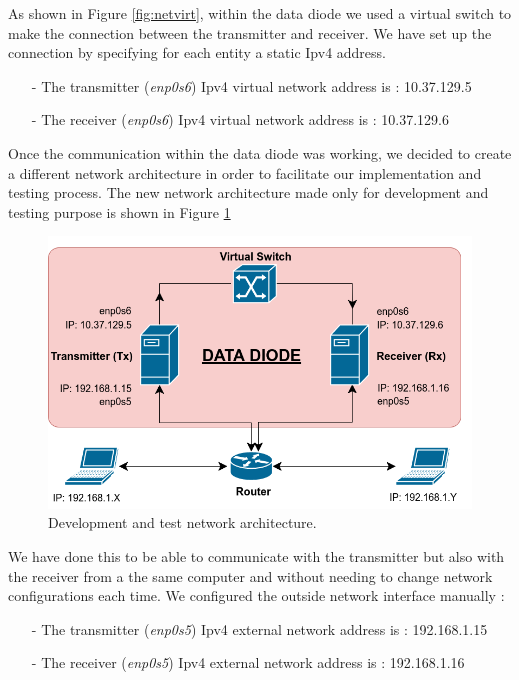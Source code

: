 \documentclass[a4paper,10pt]{article}
\begin{document}
As shown in Figure \ref{fig:netvirt}, within the data diode we used a virtual switch to make the connection between the transmitter and receiver. We have set up the connection by specifying for each entity a static Ipv4 address. 
\begin{enumerate}
\item[-] The transmitter (\emph{enp0s6}) Ipv4 virtual network address is : 10.37.129.5
\item[-] The receiver (\emph{enp0s6}) Ipv4 virtual network address is : 10.37.129.6
\end{enumerate}

Once the communication within the data diode was working, we decided to create a different network architecture in order to facilitate our implementation and testing process. The new network architecture made only for development and testing purpose is shown in Figure \ref{fig:nettest}
\begin{figure}[!h]
\centering
\includegraphics[scale=0.5]{images/schema1.png}
\caption{Development and test network architecture.}
\label{fig:nettest}
\end{figure}
We have done this to be able to communicate with the transmitter but also with the receiver from a the same computer and without needing to change network configurations each time. We configured the outside network interface manually :
\begin{enumerate}
\item[-] The transmitter (\emph{enp0s5}) Ipv4 external network address is : 192.168.1.15
\item[-] The receiver (\emph{enp0s5}) Ipv4 external network address is : 192.168.1.16
\end{enumerate}
\end{document}
